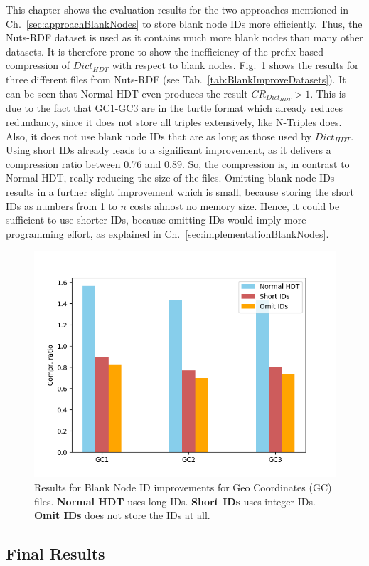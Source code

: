 This chapter shows the  evaluation results for the two approaches mentioned in Ch.~\ref{sec:approachBlankNodes} to store blank node IDs more efficiently. Thus, the Nuts-RDF dataset is used as it contains much more blank nodes than many other datasets. It is therefore prone to show the inefficiency of the prefix-based compression of $Dict_{HDT}$ with respect to blank nodes. Fig.~\ref{fig:blanknodes} shows the results for three different files from Nuts-RDF (see Tab.~\ref{tab:BlankImproveDatasets}). It can be seen that Normal HDT even produces the result $CR_{Dict_{HDT}}>1$. This is due to the fact that GC1-GC3 are in the turtle format which already reduces redundancy, since it does not store all triples extensively, like N-Triples does. Also, it does not use blank node IDs that are as long as those used by $Dict_{HDT}$. Using short IDs already leads to a significant improvement, as it delivers a compression ratio between 0.76 and 0.89. So, the compression is, in contrast to Normal HDT, really reducing the size of the files. Omitting blank node IDs results in a further slight improvement which is small, because storing the short IDs as numbers from 1 to $n$ costs almost no memory size. Hence, it could be sufficient to use shorter IDs, because omitting IDs would imply more programming effort, as explained in Ch.~\ref{sec:implementationBlankNodes}.


\begin{figure}
	\centering
	\includegraphics[width=0.7\linewidth]{figures/4_evaluation/blankNodes}
	\caption{Results for Blank Node ID improvements for Geo Coordinates (GC) files. \textbf{Normal HDT} uses long IDs. \textbf{Short IDs} uses integer IDs. \textbf{Omit IDs} does not store the IDs at all.}
	\label{fig:blanknodes}
\end{figure}

\clearpage
\subsection{Final Results}\label{sec:evaluationFinal}

